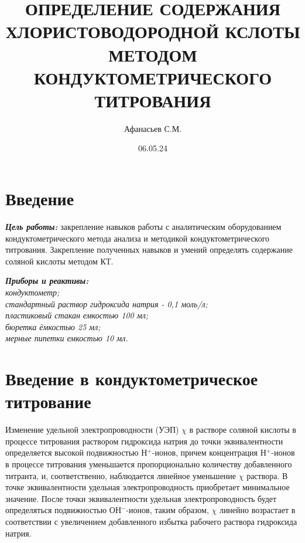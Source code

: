 \documentclass{article}
\title{ОПРЕДЕЛЕНИЕ СОДЕРЖАНИЯ ХЛОРИСТОВОДОРОДНОЙ КСЛОТЫ МЕТОДОМ КОНДУКТОМЕТРИЧЕСКОГО ТИТРОВАНИЯ}
\author{Афанасьев С.М.}
\date{06.05.24}
\begin{document}
   \maketitle
   \tableofcontents
   \newpage

   \section*{Введение}
  
   \textbf{\textit{Цель работы:}} 
   закрепление навыков работы с аналитическим оборудованием кондуктометрического метода анализа и методикой кондуктометрического титрования. 
   Закрепление полученных навыков и умений определять содержание соляной кислоты методом КТ.

   \begin{flushleft}
    \textbf{\textit{Приборы и реактивы:}} \\
    \textit{кондуктометр;} \\
    \textit{стандартный раствор гидроксида натрия - 0,1 моль/л;} \\
    \textit{пластиковый стакан емкостью 100 мл;} \\
    \textit{бюретка ёмкостью 25 мл;} \\
    \textit{мерные пипетки емкостью 10 мл.}
    \end{flushleft}
   \newpage

   \section*{Введение в кондуктометрическое титрование}
   
   Изменение удельной электропроводности (УЭП) $\chi$ в растворе соляной кислоты в процессе титрования 
   раствором гидроксида натрия до точки эквивалентности определяется высокой подвижностью Н$^+$-ионов, причем концентрация Н$^+$-ионов 
   в процессе титрования уменьшается пропорционально количеству добавленного титранта, и, соответственно, наблюдается линейное уменьшение 
   $\chi$ раствора. В точке эквивалентности удельная электропроводность приобретает минимальное значение. После точки эквивалентности 
   удельная электропроводность будет определяться подвижностью ОН$^-$-ионов, таким образом, $\chi$ линейно возрастает в соответствии 
   с увеличением добавленного избытка рабочего раствора гидроксида натрия.
\end{document}
